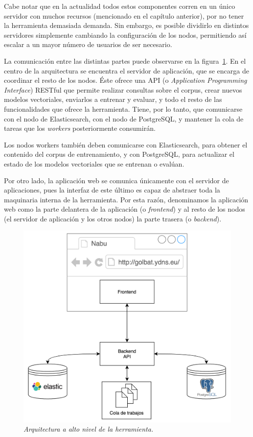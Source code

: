 Cabe notar que en la actualidad todos estos componentes corren en un único servidor con muchos
recursos (mencionado en el capítulo anterior), por no tener la herramienta demasiada demanda. Sin
embargo, es posible dividirlo en distintos servidores simplemente cambiando la configuración de los
nodos, permitiendo así escalar a un mayor número de usuarios de ser necesario.

La comunicación entre las distintas partes puede observarse en la figura~\ref{fig:diag-tool-arch}.
En el centro de la arquitectura se encuentra el servidor de aplicación, que se encarga de coordinar
el resto de los nodos. Éste ofrece una API (o \textit{Application Programming Interface}) RESTful
que permite realizar consultas sobre el corpus, crear nuevos modelos vectoriales, enviarlos a entrenar
y evaluar, y todo el resto de las funcionalidades que ofrece la herramienta. Tiene, por lo tanto, que
comunicarse con el nodo de Elasticsearch, con el nodo de PostgreSQL, y mantener la cola de tareas
que los \textit{workers} posteriormente consumirán.

Los nodos workers también deben comunicarse con Elasticsearch, para obtener el contenido del
corpus de entrenamiento, y con PostgreSQL, para actualizar el estado de los modelos vectoriales que
se entrenan o evalúan.

Por otro lado, la aplicación web se comunica únicamente con el servidor de aplicaciones, pues la
interfaz de este último es capaz de abstraer toda la maquinaria interna de la herramienta. Por esta
razón, denominamos la aplicación web como la parte delantera de la aplicación (o \textit{frontend})
y al resto de los nodos (el servidor de aplicación y los otros nodos) la parte trasera (o
\textit{backend}).

\begin{figure}[h]
    \centering
    \includegraphics[width=\textwidth]{images/diag-tool-arch}
    \caption{\textit{Arquitectura a alto nivel de la herramienta.}}
    \label{fig:diag-tool-arch}
\end{figure}


